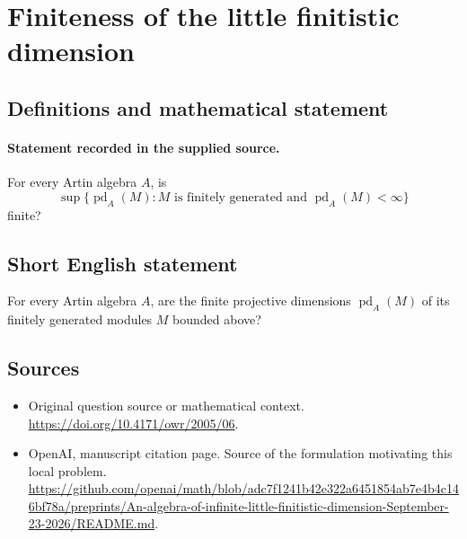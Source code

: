 \documentclass[11pt]{article}
\begin{document}
\section*{Finiteness of the little finitistic dimension}\label{statement}
\subsection{Definitions and mathematical statement}
\paragraph{Statement recorded in the supplied source.}
For every Artin algebra $A$, is
\[
\sup\{\operatorname{pd}_A(M): M\text{ is finitely generated and }\operatorname{pd}_A(M)<\infty\}
\]
finite?
\subsection{Short English statement}
For every Artin algebra $A$, are the finite projective dimensions $\operatorname{pd}_A(M)$ of its finitely generated modules $M$ bounded above?
\subsection{Sources}
\begin{itemize}
\item[S1] Original question source or mathematical context.
\url{https://doi.org/10.4171/owr/2005/06}.
\item[S2] OpenAI, manuscript citation page. Source of the formulation motivating this local problem.
\url{https://github.com/openai/math/blob/adc7f1241b42e322a6451854ab7e4b4c146bf78a/preprints/An-algebra-of-infinite-little-finitistic-dimension-September-23-2026/README.md}.
\end{itemize}
\end{document}
